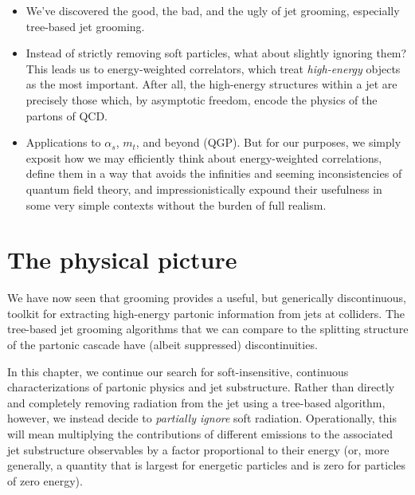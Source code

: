 \begin{itemize}
    \item
We've discovered the good, the bad, and the ugly of jet grooming, especially tree-based jet grooming.

    \item
Instead of strictly removing soft particles, what about slightly ignoring them?
%
This leads us to energy-weighted correlators, which treat \textit{high-energy} objects as the most important.
%
After all, the high-energy structures within a jet are precisely those which, by asymptotic freedom, encode the physics of the partons of QCD.

    \item
Applications to \(\alpha_s\), \(m_t\), and beyond (QGP).
%
But for our purposes, we simply exposit how we may efficiently think about energy-weighted correlations, define them  in a way that avoids the infinities and seeming inconsistencies of quantum field theory, and impressionistically expound their usefulness in some very simple contexts without the burden of full realism.
\end{itemize}

\section{The physical picture}
\label{sec:ewoc-physical-picture}

We have now seen that grooming provides a useful, but generically discontinuous, toolkit for extracting high-energy partonic information from jets at colliders.
%
The tree-based jet grooming algorithms that we can compare to the splitting structure of the partonic cascade have (albeit suppressed) discontinuities.

%

In this chapter, we continue our search for soft-insensitive, continuous characterizations of partonic physics and jet substructure.
%
Rather than directly and completely removing radiation from the jet using a tree-based algorithm, however, we instead decide to \textit{partially ignore} soft radiation.
%
Operationally, this will mean multiplying the contributions of different emissions to the associated jet substructure observables by a factor proportional to their energy (or, more generally, a quantity that is largest for energetic particles and is zero for particles of zero energy).

